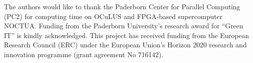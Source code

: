 \documentclass[format=acmsmall,review,authorversion,timestamp]{acmart}
\begin{document}
\begin{acks}
The authors would like to thank the Paderborn Center for Parallel Computing (PC2) for computing time on OCuLUS and FPGA-based supercomputer NOCTUA. Funding from the Paderborn University's research award for ``Green IT'' is kindly acknowledged. This project has received funding from the European Research Council (ERC) under the European Union's Horizon 2020 research and innovation programme (grant agreement No 716142).
\end{acks}



\end{document}
